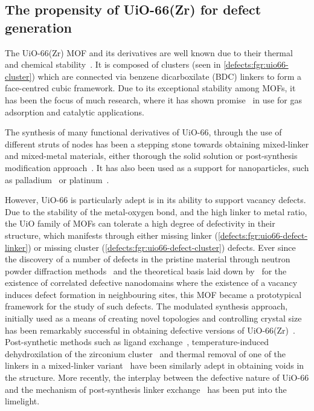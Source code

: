 \subsection{The propensity of UiO-66(Zr) for defect generation}

The UiO-66(Zr) MOF and its derivatives are well known due to
their thermal and chemical stability~\cite{cavkaNewZirconiumInorganic2008}.
It is composed of  clusters
(seen in \autoref{defects:fgr:uio66-cluster}) which are connected
via benzene dicarboxilate (BDC) linkers to form a face-centred cubic
framework. Due to its exceptional stability among MOFs, it has been the
focus of much research, where it has shown
promise~\cite{wiersumEvaluationUiO66GasBased2011} in use for gas
adsorption and catalytic applications.

The synthesis of many functional derivatives of UiO-66,
through the use of different struts of nodes has been a stepping 
stone towards obtaining mixed-linker and mixed-metal materials, 
either thorough the solid solution or post-synthesis modification
approach~\cite{kimPostsyntheticLigandExchange2012}.
It has also been used as a support for nanoparticles, such
as palladium~\cite{shenHighlyDispersedPalladium2013}
or platinum~\cite{oienProbingReactivePlatinum2015}.

However, UiO-66 is particularly adept is in its ability to support
vacancy defects. Due to the stability of the metal-oxygen bond, and the
high linker to metal ratio, the UiO family of MOFs can tolerate
a high degree of defectivity in their structure, which manifests through
either missing linker
(\autoref{defects:fgr:uio66-defect-linker}) or missing
cluster (\autoref{defects:fgr:uio66-defect-cluster}) defects.
Ever since the discovery of a number of
defects in the pristine material through neutron powder diffraction
methods~\cite{wuUnusualHighlyTunable2013} and the theoretical
basis laid down by~\citet{cliffeCorrelatedDefectNanoregions2014}
for the existence of correlated defective nanodomains where the
existence of a vacancy induces defect formation in neighbouring
sites, this MOF became a prototypical framework for the study of
such defects.
The modulated synthesis approach, initially used as
a means of creating novel topologies and controlling crystal
size~\cite{guillermZirconiumMethacrylateOxocluster2010}
has been remarkably successful in obtaining defective versions
of UiO-66(Zr)~\cite{shearerDefectEngineeringTuning2016}.
Post-synthetic methods such as ligand
exchange~\cite{shearerFunctionalizingDefectsPostsynthetic2016},
temperature-induced dehydroxilation of the zirconium
cluster~\cite{valenzanoDisclosingComplexStructure2011} and
thermal removal of one of the linkers in a mixed-linker
variant~\cite{buekenTacklingDefectConundrum2017} have been
similarly adept in obtaining voids in the structure.
More recently, the interplay between the 
defective nature of UiO-66 and the mechanism of 
post-synthesis linker exchange~\cite{taddeiPostsyntheticLigandExchange2018}
has been put into the limelight.


